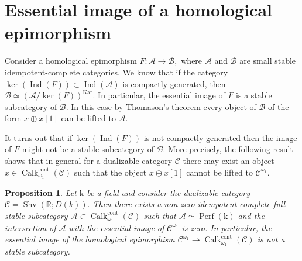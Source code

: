 \documentclass[11pt,leqno]{amsart}
\newtheorem{prop}[theo]{Proposition}
\numberwithin{equation}{section}
\def\R{\mathbb{R}}
\newcommand{\cont}{\operatorname{cont}}
\newcommand{\mk}{\mathrm k}
\newcommand{\cA}{{\mathcal A}}
\newcommand{\cB}{{\mathcal B}}
\newcommand{\cC}{{\mathcal C}}
\newcommand{\Perf}{\operatorname{Perf}}
\newcommand{\Kar}{\operatorname{Kar}}
\newcommand{\Sh}{\operatorname{Shv}}
\newcommand{\Ind}{\operatorname{Ind}}
\newcommand{\Calk}{\operatorname{Calk}}
\begin{document}

\section{Essential image of a homological epimorphism}
\label{app:image_of_hom_epi}

Consider a homological epimorphism $F:\cA\to\cB,$ where $\cA$ and $\cB$ are small stable idempotent-complete categories. We know that if the category $\ker(\Ind(F))\subset\Ind(\cA)$ is compactly generated, then $\cB\simeq (\cA/\ker(F))^{\Kar}.$ In particular, the essential image of $F$ is a stable subcategory of $\cB.$ In this case by Thomason's theorem every object of $\cB$ of the form $x\oplus x[1]$ can be lifted to $\cA.$

It turns out that if $\ker(\Ind(F))$ is not compactly generated then the image of $F$ might not be a stable subcategory of $\cB.$ More precisely, the following result shows that in general for a dualizable category $\cC$ there may exist an object $x\in\Calk_{\omega_1}^{\cont}(\cC)$ such that the object $x\oplus x[1]$ cannot be lifted to $\cC^{\omega_1}.$

\begin{prop}\label{prop:image_not_a_stable_subcat} Let $\mk$ be a field and consider the dualizable category $\cC=\Sh(\R;D(k)).$ Then there exists a non-zero idempotent-complete full stable subcategory $\cA\subset\Calk_{\omega_1}^{\cont}(\cC)$ such that $\cA\simeq\Perf(\mk)$ and the intersection of $\cA$ with the essential image of $\cC^{\omega_1}$ is zero. In particular, the essential image of the homological epimorphism $\cC^{\omega_1}\to \Calk_{\omega_1}^{\cont}(\cC)$ is not a stable subcategory.\end{prop}
\end{document}
